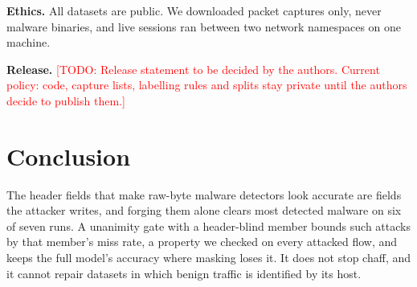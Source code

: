 \documentclass[journal]{IEEEtran}
\newcommand{\todo}[1]{\textcolor{red}{[TODO: #1]}}
\begin{document}
\textbf{Ethics.} All datasets are public. We downloaded packet captures only, never malware binaries, and live sessions ran between two network namespaces on one machine.

\textbf{Release.} \todo{Release statement to be decided by the authors. Current policy: code, capture lists, labelling rules and splits stay private until the authors decide to publish them.}

\section{Conclusion}
\label{sec:conclusion}

The header fields that make raw-byte malware detectors look accurate are fields the attacker writes, and forging them alone clears most detected malware on six of seven runs. A unanimity gate with a header-blind member bounds such attacks by that member's miss rate, a property we checked on every attacked flow, and keeps the full model's accuracy where masking loses it. It does not stop chaff, and it cannot repair datasets in which benign traffic is identified by its host.



\end{document}
